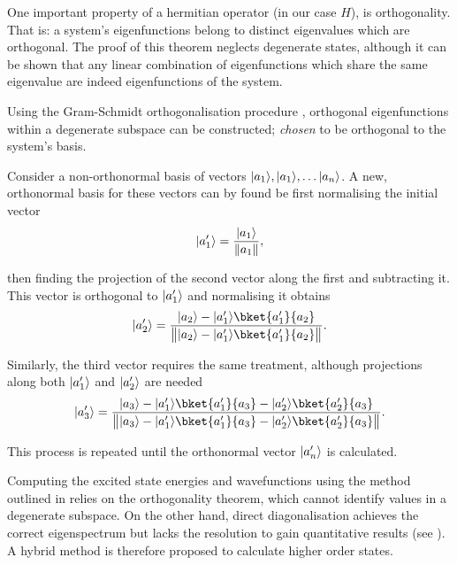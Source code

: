One important property of a hermitian operator (in our case $H$), is orthogonality. That is: a system's eigenfunctions belong to distinct eigenvalues which are orthogonal.
The proof of this theorem neglects degenerate states, although it can be shown that any linear combination of eigenfunctions which share the same eigenvalue are indeed eigenfunctions of the system.

Using the Gram-Schmidt orthogonalisation procedure \cite{Gram1883, Schmidt1907}, orthogonal eigenfunctions within a degenerate subspace can be constructed; \textit{chosen} to be orthogonal to the system's basis.

Consider a non-orthonormal basis of vectors $\lvert a_1\rangle, \lvert a_1\rangle, \ldots \lvert a_n\rangle$.
A new, orthonormal basis for these vectors can by found be first normalising the initial vector
\begin{equation}
\lvert a^\prime_1\rangle = \frac{\lvert a_1\rangle}{\lVert a_1\rVert},
\end{equation}

then finding the projection of the second vector along the first and subtracting it.
This vector is orthogonal to $\lvert a^\prime_1\rangle$ and normalising it obtains
\begin{equation}
\ket{a^\prime_2} = \frac{\ket{a_2}-\ket{a^\prime_1}\bket{a^\prime_1}{a_2}}{\norm[\big]{\ket{a_2}-\ket{a^\prime_1}\bket{a^\prime_1}{a_2}}}.
\end{equation}

Similarly, the third vector requires the same treatment, although projections along both $\lvert a^\prime_1\rangle$ and $\lvert a^\prime_2\rangle$ are needed
\begin{equation}
\ket{a^\prime_3} = \frac{\ket{a_3}-\ket{a^\prime_1}\bket{a^\prime_1}{a_3}-\ket{a^\prime_2}\bket{a^\prime_2}{a_3}}{\norm[\big]{\ket{a_3}-\ket{a^\prime_1}\bket{a^\prime_1}{a_3}-\ket{a^\prime_2}\bket{a^\prime_2}{a_3}}}.\label{eq:gs3ex}
\end{equation}

This process is repeated until the orthonormal vector $\lvert a^\prime_n\rangle$ is calculated.

Computing the excited state energies and wavefunctions using the method outlined in  relies on the orthogonality theorem, which cannot identify values in a degenerate subspace.
On the other hand, direct diagonalisation achieves the correct eigenspectrum but lacks the resolution to gain quantitative results (see ).
A hybrid method is therefore proposed to calculate higher order states.

